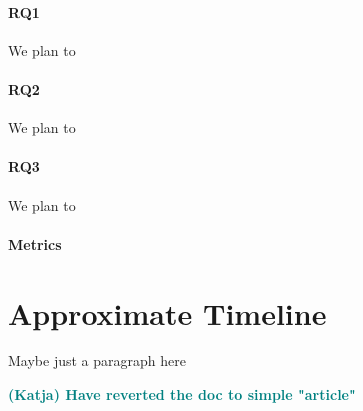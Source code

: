 \documentclass{article}
\newcommand{\katja}[1]{\textbf{\textcolor{teal}{(Katja) #1}}}
\begin{document}
\paragraph{RQ1} 
We plan to 

\paragraph{RQ2}
We plan to

\paragraph{RQ3}
We plan to

\paragraph{Metrics}

\section{Approximate Timeline}
Maybe just a paragraph here


\katja{Have reverted the doc to simple "article"}



\end{document}

